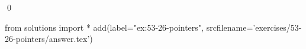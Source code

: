 
\begin{ex}
  \label{ex:53-26-pointers}
  
  \qed
\end{ex}
\begin{python0}
from solutions import *
add(label="ex:53-26-pointers",
    srcfilename='exercises/53-26-pointers/answer.tex')
\end{python0}
